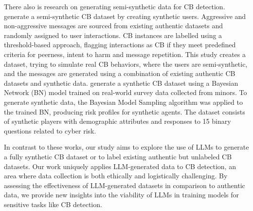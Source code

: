 There also is research %
on generating semi-synthetic data for CB detection.
 generate a semi-synthetic CB dataset by creating synthetic users. %
Aggressive and non-aggressive messages are sourced from existing authentic datasets and randomly assigned to user interactions.
CB instances are labelled using a threshold-based approach, flagging interactions as CB if they meet predefined criteria for peerness, intent to harm and message repetition.
This study creates a dataset, trying to simulate real CB behaviors, where the users are semi-synthetic, and the messages are generated using a combination of existing authentic CB datasets and synthetic data.
 generate
a synthetic CB dataset using a Bayesian Network (BN) model
\cite{pearl-1988-probabilistic} trained on real-world survey data collected from minors. To generate synthetic data, the Bayesian Model Sampling algorithm was applied to the trained BN, producing risk profiles for synthetic agents.
The dataset consists of synthetic players with demographic attributes and responses to 15 binary questions related to cyber risk.

In contrast to these works, our study aims to explore the use of LLMs to generate a fully synthetic CB dataset or to label existing authentic but unlabeled CB datasets.
Our work uniquely applies LLM-generated data to CB detection, an area where data collection is both ethically and logistically challenging.
By assessing the effectiveness of LLM-generated datasets in comparison to authentic data,
we provide new insights into the viability of LLMs in training models for sensitive tasks like CB detection. %



